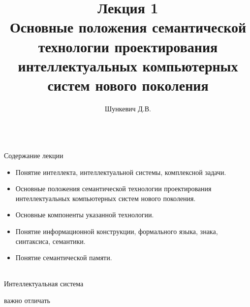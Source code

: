 
\title{Лекция 1\\Основные положения семантической технологии проектирования интеллектуальных компьютерных систем нового поколения \vspace{-2em}} 
\author[]{Шункевич Д.В.}

\begin{frame}
	\titlepage
\end{frame}

\begin{frame}{\\Содержание лекции}
	\vspace{10mm}
	\topline
	\justifying
	\begin{itemize}
		\item Понятие интеллекта, интеллектуальной системы, комплексной задачи.
		\item Основные положения семантической технологии проектирования интеллектуальных компьютерных систем нового поколения.
		\item Основные компоненты указанной технологии.
		\item Понятие информационной конструкции, формального языка, знака, синтаксиса, семантики.
		\item Понятие семантической памяти.
	\end{itemize}

\end{frame}

\begin{frame}{\\Интеллектуальная система}
	\vspace{10mm}
	\begin{SCn}
	\end{SCn}	
	\begin{scnrelfromset}{важно отличать}
	\end{scnrelfromset}
\end{frame}

